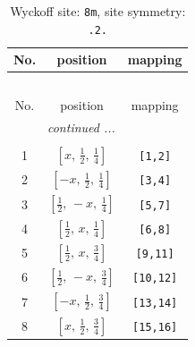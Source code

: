 \documentclass[fleqn,8pt]{jsarticle}
\begin{document}
\begin{longtable}{ccc}
\caption{Wyckoff site: {\tt 8m}, site symmetry: {\tt .2.}}
 \\
 \hline \hline
No. & position & mapping \\ \hline \endfirsthead

\multicolumn{2}{l}{\tablename\ \thetable{}} \\
 \hline \hline
No. & position & mapping \\ \hline \endhead

 \hline \hline
\multicolumn{2}{r}{\footnotesize\it continued ...} \\ \endfoot

 \hline \hline
\multicolumn{2}{r}{} \\ \endlastfoot

1 & $\left[ x,\, \frac{1}{2},\, \frac{1}{4} \right]$ & {\tt [1,2]} \\ \hline
2 & $\left[ - x,\, \frac{1}{2},\, \frac{1}{4} \right]$ & {\tt [3,4]} \\ \hline
3 & $\left[ \frac{1}{2},\, - x,\, \frac{1}{4} \right]$ & {\tt [5,7]} \\ \hline
4 & $\left[ \frac{1}{2},\, x,\, \frac{1}{4} \right]$ & {\tt [6,8]} \\ \hline
5 & $\left[ \frac{1}{2},\, x,\, \frac{3}{4} \right]$ & {\tt [9,11]} \\ \hline
6 & $\left[ \frac{1}{2},\, - x,\, \frac{3}{4} \right]$ & {\tt [10,12]} \\ \hline
7 & $\left[ - x,\, \frac{1}{2},\, \frac{3}{4} \right]$ & {\tt [13,14]} \\ \hline
8 & $\left[ x,\, \frac{1}{2},\, \frac{3}{4} \right]$ & {\tt [15,16]} \\
\end{longtable}
\renewcommand{\arraystretch}{1.2}
\end{document}
